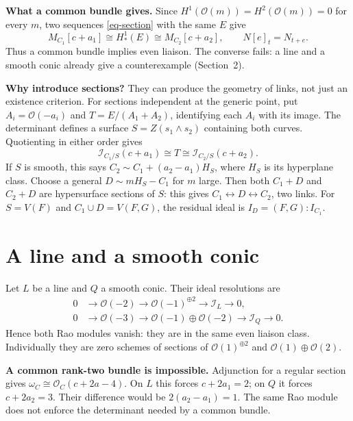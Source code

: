 \documentclass[11pt,a4paper]{article}
\begin{document}
\textbf{What a common bundle gives.}
Since $H^1(\mathcal{O}(m))=
H^2(\mathcal{O}(m))=0$ for every $m$,
two sequences \eqref{eq-section}
with the same $E$ give
$$
M_{C_1}[c+a_1]\cong H^1_*(E)
\cong M_{C_2}[c+a_2],
\qquad N[e]_t=N_{t+e}.
$$
Thus a common bundle implies even
liaison. The converse fails: a line
and a smooth conic already give a
counterexample (Section~2).

\textbf{Why introduce sections?}
They can produce the geometry of links,
not just an existence criterion.
For sections independent at the
generic point,
put $A_i=\mathcal{O}(-a_i)$ and
$T=E/(A_1+A_2)$, identifying each $A_i$
with its image. The determinant defines
a surface $S=Z(s_1\wedge s_2)$ containing
both curves. Quotienting in either order
gives
$$
\mathcal{I}_{C_1/S}(c+a_1)
\cong T\cong
\mathcal{I}_{C_2/S}(c+a_2).
$$
If $S$ is smooth, this says
$C_2\sim C_1+(a_2-a_1)H_S$, where
$H_S$ is its hyperplane class.
Choose a general $D\sim mH_S-C_1$
for $m$ large. Then both $C_1+D$ and
$C_2+D$ are hypersurface sections of
$S$: this gives $C_1\leftrightarrow
D\leftrightarrow C_2$, two links.
For $S=V(F)$ and $C_1\cup D=V(F,G)$,
the residual ideal is
$I_D=(F,G):I_{C_1}$.

\newpage
\section{A line and a smooth conic}

Let $L$ be a line and $Q$ a smooth conic.
Their ideal resolutions are
$$
\begin{aligned}
0&\to\mathcal{O}(-2)
\to\mathcal{O}(-1)^{\oplus2}
\to\mathcal{I}_L\to0,\\
0&\to\mathcal{O}(-3)
\to\mathcal{O}(-1)\oplus\mathcal{O}(-2)
\to\mathcal{I}_Q\to0.
\end{aligned}
$$
Hence both Rao modules vanish: they
are in the same even liaison class.
Individually they are zero schemes of
sections of $\mathcal{O}(1)^{\oplus2}$
and $\mathcal{O}(1)\oplus\mathcal{O}(2)$.

\textbf{A common rank-two bundle is
impossible.}
Adjunction for a regular section gives
$\omega_C\cong\mathcal{O}_C(c+2a-4)$.
On $L$ this forces $c+2a_1=2$;
on $Q$ it forces $c+2a_2=3$.
Their difference would be
$2(a_2-a_1)=1$.
The same Rao module does not enforce
the determinant needed by a common bundle.
\end{document}
